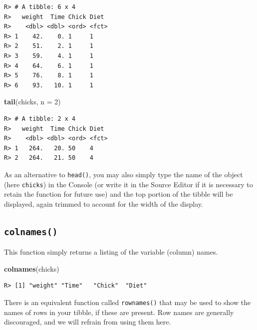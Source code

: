 \documentclass[english,10pt,a4paper,oneside]{book}
\newenvironment{Shaded}{\begin{snugshade}}{\end{snugshade}}
\newcommand{\DataTypeTok}[1]{\textcolor[rgb]{0.13,0.29,0.53}{#1}}
\newcommand{\DecValTok}[1]{\textcolor[rgb]{0.00,0.00,0.81}{#1}}
\newcommand{\KeywordTok}[1]{\textcolor[rgb]{0.13,0.29,0.53}{\textbf{#1}}}
\newcommand{\NormalTok}[1]{#1}
\theoremstyle{definition}
\theoremstyle{definition}
\theoremstyle{definition}
\theoremstyle{remark}
\begin{document}
\begin{verbatim}
R> # A tibble: 6 x 4
R>   weight  Time Chick Diet 
R>    <dbl> <dbl> <ord> <fct>
R> 1    42.    0. 1     1    
R> 2    51.    2. 1     1    
R> 3    59.    4. 1     1    
R> 4    64.    6. 1     1    
R> 5    76.    8. 1     1    
R> 6    93.   10. 1     1
\end{verbatim}

\begin{Shaded}
\begin{Highlighting}[]
\KeywordTok{tail}\NormalTok{(chicks, }\DataTypeTok{n =} \DecValTok{2}\NormalTok{)}
\end{Highlighting}
\end{Shaded}

\begin{verbatim}
R> # A tibble: 2 x 4
R>   weight  Time Chick Diet 
R>    <dbl> <dbl> <ord> <fct>
R> 1   264.   20. 50    4    
R> 2   264.   21. 50    4
\end{verbatim}

As an alternative to \texttt{head()}, you may also simply type the name
of the object (here \texttt{chicks}) in the Console (or write it in the
Source Editor if it is necessary to retain the function for future use)
and the top portion of the tibble will be displayed, again trimmed to
account for the width of the display.

\hypertarget{colnames}{%
\subsection{\texorpdfstring{\texttt{colnames()}}{colnames()}}\label{colnames}}

This function simply returns a listing of the variable (column) names.

\begin{Shaded}
\begin{Highlighting}[]
\KeywordTok{colnames}\NormalTok{(chicks)}
\end{Highlighting}
\end{Shaded}

\begin{verbatim}
R> [1] "weight" "Time"   "Chick"  "Diet"
\end{verbatim}

There is an equivalent function called \texttt{rownames()} that may be
used to show the names of rows in your tibble, if these are present. Row
names are generally discouraged, and we will refrain from using them
here.
\end{document}
